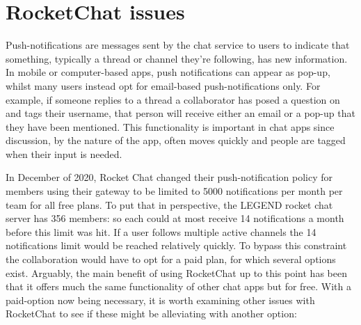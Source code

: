 \documentclass[11pt,letterpaper]{article}
\begin{document}
\section{RocketChat issues}
Push-notifications are messages sent by the chat service to users to indicate that something, typically a thread or channel they're following, has new information. In mobile or computer-based apps, push notifications can appear as pop-up, whilst many users instead opt for email-based push-notifications only. For example, if someone replies to a thread a collaborator has posed a question on and tags their username, that person will receive either an email or a pop-up that they have been mentioned. This functionality is important in chat apps since discussion, by the nature of the app, often moves quickly and people are tagged when their input is needed.\par
 In December of 2020, Rocket Chat changed their push-notification policy for members using their gateway to be limited to 5000 notifications per month per team for all free plans. To put that in perspective, the LEGEND rocket chat server has 356 members: so each could at most receive 14 notifications a month before this limit was hit. If a user follows multiple active channels the 14 notifications limit would be reached relatively quickly. To bypass this constraint the collaboration would have to opt for a paid plan, for which several options exist. 
Arguably, the main benefit of using RocketChat up to this point has been that it offers much the same functionality of other chat apps but for free. With a paid-option now being necessary, it is worth examining other issues with RocketChat to see if these might be alleviating with another option:
\end{document}
